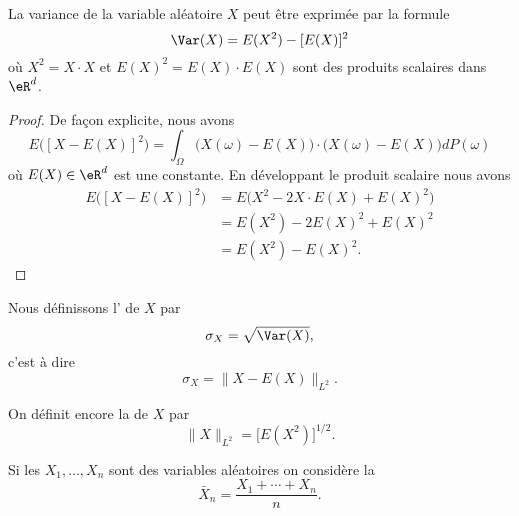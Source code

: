 \begin{proposition}     \label{PrropVarAlterfrom}
	La variance de la variable aléatoire \( X\) peut être exprimée par la formule
	\begin{equation}        \label{EqtWqMGB}
		\Var(X)=E(X^2)-[E(X)]^2
	\end{equation}
	où \( X^2=X\cdot X\) et \( E(X)^2=E(X)\cdot E(X)\) sont des produits scalaires dans \( \eR^d\).
\end{proposition}

\begin{proof}
	De façon explicite, nous avons
	\begin{equation}
		E\big( [X-E(X)]^2 \big)=\int_{\Omega}\big( X(\omega)-E(X) \big)\cdot\big( X(\omega)-E(X) \big)dP(\omega)
	\end{equation}
	où \( E(X)\in\eR^d\) est une constante. En développant le produit scalaire nous avons
	\begin{subequations}
		\begin{align}
			E\big( [X-E(X)]^2 \big) & =E\big( X^2-2X\cdot E(X)+E(X)^2 \big) \\
			                        & =E(X^2)-2E(X)^2+E(X)^2                \\
			                        & =E(X^2)-E(X)^2.
		\end{align}
	\end{subequations}
\end{proof}

\begin{definition}

	Nous définissons l' de \( X\) par
	\begin{equation}
		\sigma_X=\sqrt{\Var(X)},
	\end{equation}
	c'est à dire
	\begin{equation}
		\sigma_X=\| X-E(X) \|_{L^2}.
	\end{equation}
\end{definition}


\begin{definition}
	On définit encore la  de \( X\) par
	\begin{equation}
		\| X \|_{L^2}=\big[ E(X^2) \big]^{1/2}.
	\end{equation}
\end{definition}

\begin{definition}
	Si les \( X_1,\ldots,X_n\) sont des variables aléatoires on considère la 
	\begin{equation}
		\bar X_n=\frac{ X_1+\cdots+X_n }{ n }.
	\end{equation}
\end{definition}

